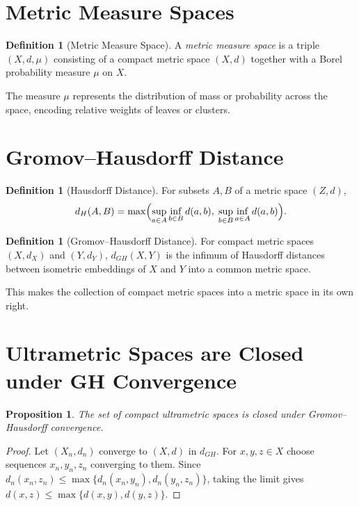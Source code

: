 \documentclass[12pt,a4paper,oneside]{book}
\numberwithin{equation}{chapter}
\theoremstyle{plain}
\newtheorem{proposition}[theorem]{Proposition}
\theoremstyle{definition}
\newtheorem{definition}[theorem]{Definition}
\theoremstyle{remark}
\begin{document}
\section{Metric Measure Spaces}

\begin{definition}[Metric Measure Space]
A \emph{metric measure space} is a triple $(X,d,\mu)$ consisting of
a compact metric space $(X,d)$ together with a Borel probability
measure $\mu$ on $X$.
\end{definition}

The measure $\mu$ represents the distribution of mass or probability
across the space, encoding relative weights of leaves or clusters.

\section{Gromov--Hausdorff Distance}

\begin{definition}[Hausdorff Distance]
For subsets $A,B$ of a metric space $(Z,d)$,
\[
d_H(A,B) = \max\Bigl(
\sup_{a \in A}\inf_{b \in B}d(a,b),\;
\sup_{b \in B}\inf_{a \in A}d(a,b)
\Bigr).
\]
\end{definition}

\begin{definition}[Gromov--Hausdorff Distance]
For compact metric spaces $(X,d_X)$ and $(Y,d_Y)$,
$d_{GH}(X,Y)$ is the infimum of Hausdorff distances between isometric
embeddings of $X$ and $Y$ into a common metric space.
\end{definition}

This makes the collection of compact metric spaces into a metric space
in its own right.

\section{Ultrametric Spaces are Closed under GH Convergence}

\begin{proposition}
The set of compact ultrametric spaces is closed under
Gromov--Hausdorff convergence.
\end{proposition}

\begin{proof}
Let $(X_n,d_n)$ converge to $(X,d)$ in $d_{GH}$. For $x,y,z \in X$
choose sequences $x_n,y_n,z_n$ converging to them. Since
$d_n(x_n,z_n) \leq \max\{d_n(x_n,y_n), d_n(y_n,z_n)\}$, taking
the limit gives $d(x,z) \leq \max\{d(x,y),d(y,z)\}$.
\end{proof}
\end{document}
